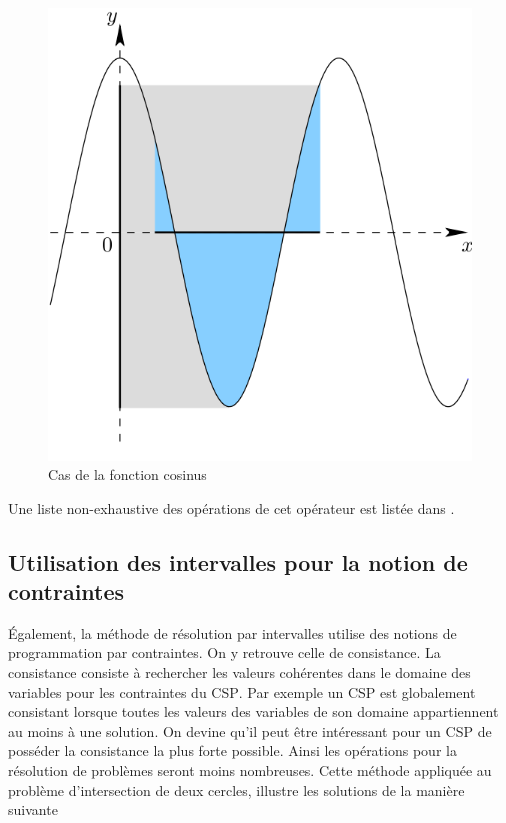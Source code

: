 \begin{figure}[h] %
  \center
\includegraphics[scale=0.30]{img/cos}
  \caption{Cas de la fonction cosinus} %
 \label{fig:Cos} %
\end{figure} %


Une liste non-exhaustive des opérations de cet opérateur est listée dans \cite{Goualard}.



\subsection{Utilisation des intervalles pour la notion de contraintes}
\'Egalement, la méthode de résolution par intervalles utilise des notions de programmation par contraintes. On y retrouve celle de consistance. La consistance consiste à rechercher les valeurs cohérentes dans le domaine des variables pour les contraintes du \textsc{CSP}. Par exemple un \textsc{CSP} est globalement consistant lorsque toutes les valeurs des variables de son domaine appartiennent au moins à une solution. On devine qu'il peut être intéressant pour un \textsc{CSP} de posséder la consistance la plus forte possible. Ainsi les opérations pour la résolution de problèmes seront moins nombreuses. Cette méthode appliquée au problème d'intersection de deux cercles, illustre les solutions de la manière suivante   

